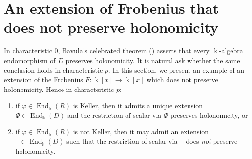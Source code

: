 \documentclass[11pt]{amsart}
\theoremstyle{definition}
\theoremstyle{remark}
\numberwithin{equation}{subsection}
\DeclareMathOperator{\kk}{\Bbbk}
\DeclareMathOperator{\tv}{\tilde{\varphi}}
\DeclareMathOperator{\End}{End}
\begin{document}
\section{An extension of Frobenius that does not preserve holonomicity}
\label{counter example}
In characteristic 0, Bavula's celebrated theorem (\cite[Theorem 1.3]{BavulaAnnals}) asserts that every $\kk$-algebra endomorphism of $D$ preserves holonomicity. It is natural ask whether the same conclusion holds in characteristic $p$. In this section, we present an example of an extension of the Frobenius $F:\kk[x]\to \kk[x]$ which does not preserve holonomicity. Hence in characteristic $p$:
\begin{enumerate}
\item if $\varphi\in \End_{\kk}(R)$ is Keller, then it admits a unique extension $\Phi\in \End_{\kk}(D)$ and the restriction of scalar via $\Phi$ preserves holonomicity, or
\item if $\varphi\in \End_{\kk}(R)$ is not Keller, then it may admit an extension $\tv\in \End_{\kk}(D)$ such that the restriction of scalar via $\tv$ does {\it not} preserve holonomicity.
\end{enumerate}
\end{document}

